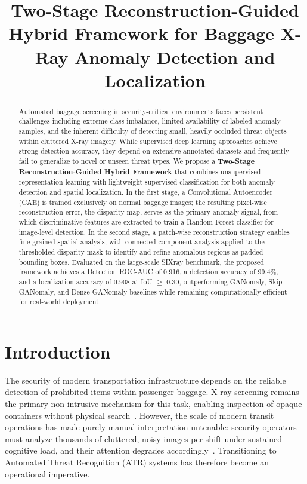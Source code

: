 \documentclass{bmvc2k}
\title{Two-Stage Reconstruction-Guided Hybrid Framework for Baggage X-Ray Anomaly Detection and Localization}
\begin{document}
\maketitle

\begin{abstract}
	Automated baggage screening in security-critical environments faces persistent challenges 
	including extreme class imbalance, limited availability of labeled anomaly samples, and 
	the inherent difficulty of detecting small, heavily occluded threat objects within 
	cluttered X-ray imagery. While supervised deep learning approaches achieve strong 
	detection accuracy, they depend on extensive annotated datasets and frequently fail to 
	generalize to novel or unseen threat types. We propose a \textbf{Two-Stage 
		Reconstruction-Guided Hybrid Framework} that combines unsupervised representation 
	learning with lightweight supervised classification for both anomaly detection and 
	spatial localization. In the first stage, a Convolutional Autoencoder (CAE) is trained 
	exclusively on normal baggage images; the resulting pixel-wise reconstruction error, the disparity map, serves as the primary anomaly signal, from which 
	discriminative features are extracted to train a Random Forest classifier for 
	image-level detection. In the second stage, a patch-wise reconstruction strategy 
	enables fine-grained spatial analysis, with connected component analysis applied to 
	the thresholded disparity mask to identify and refine anomalous regions as padded 
	bounding boxes. Evaluated on the large-scale SIXray benchmark, the proposed framework 
	achieves a Detection ROC-AUC of 0.916, a detection accuracy of 99.4\%, and a 
	localization accuracy of 0.908 at IoU $\geq$ 0.30, outperforming GANomaly, 
	Skip-GANomaly, and Dense-GANomaly baselines while remaining computationally efficient 
	for real-world deployment.
\end{abstract}

\section{Introduction}
\label{sec:intro}

The security of modern transportation infrastructure depends on the reliable detection 
of prohibited items within passenger baggage. X-ray screening remains the primary 
non-intrusive mechanism for this task, enabling inspection of opaque containers without 
physical search~\cite{tackling2016jaccard}. However, the scale of modern transit operations has 
made purely manual interpretation untenable: security operators must analyze thousands 
of cluttered, noisy images per shift under sustained cognitive load, and their attention 
degrades accordingly~\cite{baggage2022abdelfatah}. Transitioning to Automated Threat Recognition 
(ATR) systems has therefore become an operational imperative.
\end{document}
